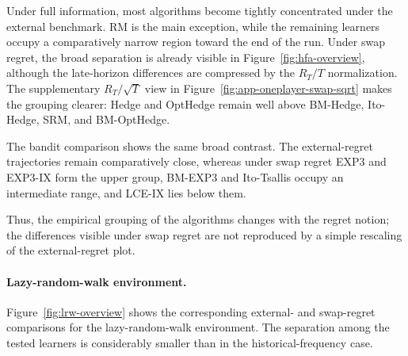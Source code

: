 Under full information, most algorithms become tightly concentrated under
the external benchmark. RM is the main exception, while the remaining
learners occupy a comparatively narrow region toward the end of the run.
Under swap regret, the broad separation is already visible in
Figure~\ref{fig:hfa-overview}, although the late-horizon differences are
compressed by the \(R_T/T\) normalization. The supplementary
\(R_T/\sqrt{T}\) view in Figure~\ref{fig:app-oneplayer-swap-sqrt} makes the
grouping clearer: Hedge and OptHedge remain well above BM-Hedge, Ito-Hedge,
SRM, and BM-OptHedge.

The bandit comparison shows the same broad contrast. The external-regret
trajectories remain comparatively close, whereas under swap regret EXP3 and
EXP3-IX form the upper group, BM-EXP3 and Ito-Tsallis occupy an intermediate
range, and LCE-IX lies below them.

Thus, the empirical grouping of the algorithms changes with the regret
notion; the differences visible under swap regret are not reproduced by a
simple rescaling of the external-regret plot.


\paragraph{Lazy-random-walk environment.}

Figure~\ref{fig:lrw-overview} shows the corresponding external- and
swap-regret comparisons for the lazy-random-walk environment. The separation
among the tested learners is considerably smaller than in the
historical-frequency case.

